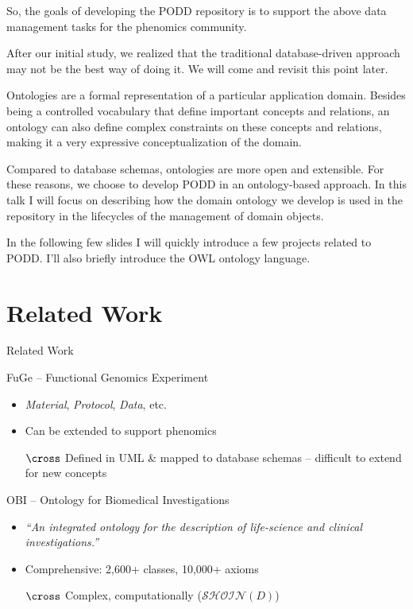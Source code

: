 \documentclass[ignorenonframetext,compress]{beamer}
\begin{document}
So, the goals of developing the PODD repository is to support the
above data management tasks for the phenomics community.

After our initial study, we realized that the traditional
database-driven approach may not be the best way of doing it. We
will come and revisit this point later.

Ontologies are a formal representation of a particular application
domain. Besides being a controlled vocabulary that define important
concepts and relations, an ontology can also define complex constraints
on these concepts and relations, making it a very expressive
conceptualization of the domain.

Compared to database schemas, ontologies are more open and
extensible. For these reasons, we choose to develop PODD in an
ontology-based approach. In this talk I will focus on describing how
the domain ontology we develop is used in the repository in the
lifecycles of the management of domain objects.

In the following few slides I will quickly introduce a few projects
related to PODD. I'll also briefly introduce the OWL ontology
language.

\section{Related Work}
\begin{frame}{Related Work}
\begin{block}{FuGe -- Functional Genomics Experiment}
    \begin{itemize}
        \item \emph{Material}, \emph{Protocol}, \emph{Data}, etc.
        \item Can be extended to support phenomics
        \item[$\cross$] Defined in UML \& mapped to database schemas -- difficult to extend for new concepts
    \end{itemize}
\end{block}
\pause
\begin{block}{OBI -- Ontology for Biomedical Investigations}
    \begin{itemize}
        \item \textit{``An integrated ontology for the description of life-science and clinical
        investigations.''}
        \item Comprehensive: 2,600+ classes, 10,000+ axioms
        \item[$\cross$] Complex, computationally ($\mathcal{SHOIN}(D)$)
    \end{itemize}
\end{block}
\end{frame}
\end{document}
